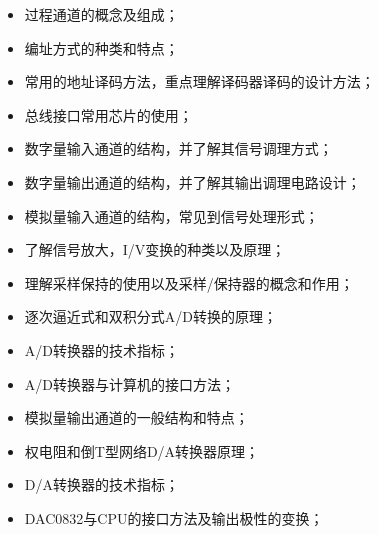 \begin{itemize}

\item 过程通道的概念及组成；
\item 编址方式的种类和特点；
\item 常用的地址译码方法，重点理解译码器译码的设计方法；
\item 总线接口常用芯片的使用；
\item 数字量输入通道的结构，并了解其信号调理方式；
\item 数字量输出通道的结构，并了解其输出调理电路设计；
\item 模拟量输入通道的结构，常见到信号处理形式；
\item 了解信号放大，I/V变换的种类以及原理；
\item 理解采样保持的使用以及采样/保持器的概念和作用；
\item 逐次逼近式和双积分式A/D转换的原理；
\item A/D转换器的技术指标；
\item A/D转换器与计算机的接口方法；
\item 模拟量输出通道的一般结构和特点；
\item 权电阻和倒T型网络D/A转换器原理；
\item D/A转换器的技术指标；
\item DAC0832与CPU的接口方法及输出极性的变换；


\end{itemize}
